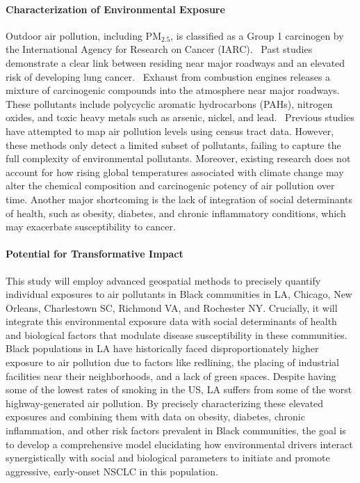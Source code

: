 \paragraph{Characterization of Environmental Exposure}
Outdoor air pollution, including PM$_{2.5}$, is classified as a Group 1 carcinogen by the International Agency for Research on Cancer (IARC).~\cite{gowda_ambient_2019} 
Past studies demonstrate a clear link between residing near major roadways and an elevated risk of developing lung cancer.~\cite{gowda_ambient_2019} 
Exhaust from combustion engines releases a mixture of carcinogenic compounds into the atmosphere near major roadways. 
These pollutants include polycyclic aromatic hydrocarbons (PAHs), nitrogen oxides, and toxic heavy metals such as arsenic, nickel, and lead.~\cite{yu_characterization_2015} 
Previous studies have attempted to map air pollution levels using census tract data.
However, these methods only detect a limited subset of pollutants, failing to capture the full complexity of environmental pollutants.
Moreover, existing research does not account for how rising global temperatures associated with climate change 
may alter the chemical composition and carcinogenic potency of air pollution over time. 
Another major shortcoming is the lack of integration of social determinants of health, 
such as obesity, diabetes, and chronic inflammatory conditions, which may exacerbate susceptibility to cancer.

\paragraph{Potential for Transformative Impact}

This study will employ advanced geospatial methods to precisely quantify individual exposures to air pollutants 
in Black communities in LA, Chicago, New Orleans, Charlestown SC, Richmond VA, and Rochester NY. 
Crucially, it will integrate this environmental exposure data with social determinants of health and biological factors 
that modulate disease susceptibility in these communities. 
Black populations in LA have historically faced disproportionately higher exposure to air pollution 
due to factors like redlining, the placing of industrial facilities near their neighborhoods, and a lack of green spaces. 
Despite having some of the lowest rates of smoking in the US, LA suffers from some of the worst highway-generated air pollution. 
By precisely characterizing these elevated exposures and combining them with data on 
obesity, diabetes, chronic inflammation, and other risk factors prevalent in Black communities, 
the goal is to develop a comprehensive model elucidating how environmental drivers interact synergistically with 
social and biological parameters to initiate and promote aggressive, early-onset NSCLC in this population. 

